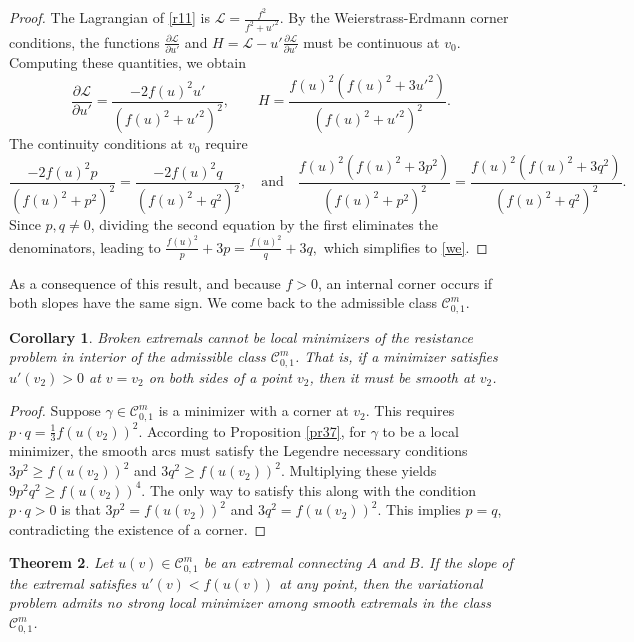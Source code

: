 \documentclass[a4paper,12pt]{amsart}
\newtheorem{theorem}{Theorem}[section]
\newtheorem{corollary}[theorem]{Corollary}
\theoremstyle{definition}
\begin{document}
 
\begin{proof}
  The Lagrangian of \eqref{r11} is 
$\mathcal{L}=\frac{f^2}{ f^2+u'^2}$. By the Weierstrass-Erdmann corner conditions, the functions $\frac{\partial \mathcal{L}}{\partial u'}$ and $H = \mathcal{L} - u'\frac{\partial \mathcal{L}}{\partial u'}$ must be continuous at $v_0$. 
Computing  these quantities, we obtain
$$\frac{\partial \mathcal{L}}{\partial u'} = \frac{-2f(u)^2 u'}{(f(u)^2 + u'^2)^2}, \qquad H = \frac{f(u)^2 \left( f(u)^2 + 3u'^2 \right)}{(f(u)^2 + u'^2)^2}.$$
 The continuity conditions at $v_0$ require
$$\frac{-2f(u)^2 p}{(f(u)^2 + p^2)^2} = \frac{-2f(u)^2 q}{(f(u)^2 + q^2)^2}, \quad \mbox{and}\quad 
\frac{f(u)^2 \left( f(u)^2 + 3p^2 \right)}{(f(u)^2 + p^2)^2} = \frac{f(u)^2 \left( f(u)^2 + 3q^2 \right)}{(f(u)^2 + q^2)^2}.$$
Since $p, q \neq 0$, dividing the second equation by the first eliminates the denominators, leading to $ \frac{f(u)^2}{p} + 3p = \frac{f(u)^2}{q} + 3q,$ which simplifies to   \eqref{we}.
\end{proof}

As a consequence of this result, and because $f>0$, an internal corner occurs if both slopes have the same sign. We come back to the     admissible class  $\mathcal{C}_{0,1}^m$. 

 

 \begin{corollary} \label{co52}
 Broken extremals   cannot be local minimizers of the resistance problem in interior of the  admissible class   $\mathcal{C}_{0,1}^m$. That is, if a minimizer satisfies $u'(v_2)>0$ at $v=v_2$ on both sides of a point $v_2$, then it must be smooth at $v_2$. 
\end{corollary}

\begin{proof}
Suppose  $\gamma \in \mathcal{C}_{0,1}^m$ is a minimizer with a corner at $v_2$. This requires $p\cdot q=\frac13 f(u(v_2))^2$. According to Proposition \ref{pr37},  for $\gamma$ to be a local minimizer, the smooth arcs must satisfy the Legendre necessary conditions $3p^2\geq f(u(v_2))^2$ and    $3q^2 \ge f(u(v_2))^2$. Multiplying these   yields 
$9 p^2 q^2 \ge f(u(v_2))^4$. The only way to satisfy this along with the condition $p\cdot q>0$ is that  $3p^2 = f(u(v_2))^2$ and $3q^2 = f(u(v_2))^2$. This implies $p = q$, contradicting the existence of a corner. 
\end{proof}



\begin{theorem}\label{t42}
Let $u(v) \in \mathcal{C}_{0,1}^m$ be an extremal connecting $A$ and $B$. If the slope of the extremal satisfies $u'(v) < f(u(v))$ at any point, then the variational problem admits no strong local minimizer among smooth extremals  in the class $\mathcal{C}_{0,1}^m$. 
\end{theorem}
\end{document}
